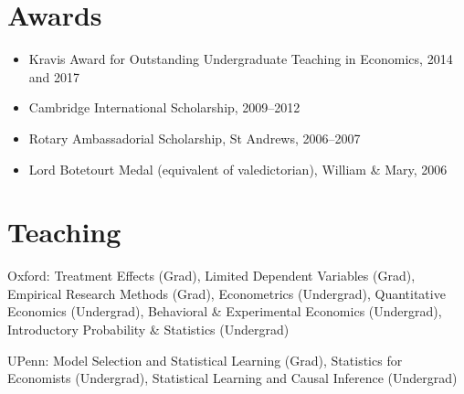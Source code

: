 \documentclass[line,overlapped]{myres}
\begin{document}
\begin{resume}


\section{\sc Awards}
\vspace{1em}
\begin{itemize}
\item Kravis Award for Outstanding Undergraduate Teaching in Economics, 2014 and 2017
\item Cambridge International Scholarship, 2009--2012
\item Rotary Ambassadorial Scholarship, St Andrews, 2006--2007
\item Lord Botetourt Medal (equivalent of valedictorian), William \& Mary, 2006
\end{itemize}

\section{\sc Teaching }
\vspace{0.5em}
Oxford: Treatment Effects (Grad), Limited Dependent Variables (Grad), Empirical Research Methods (Grad), Econometrics (Undergrad), Quantitative Economics (Undergrad), Behavioral \& Experimental Economics (Undergrad), Introductory Probability \& Statistics (Undergrad)

UPenn: Model Selection and Statistical Learning (Grad), Statistics for Economists (Undergrad), Statistical Learning and Causal Inference (Undergrad)
	



\end{resume}
\end{document}

